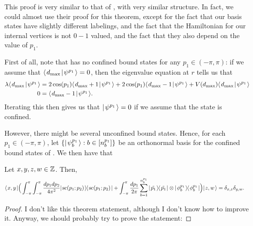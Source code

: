 \documentclass[../thesis-main/thesis-main]{subfiles}
\begin{document}
This proof is very similar to that of \cite{CG12}, with very similar structure.  In fact, we could almost use their proof for this theorem, except for the fact that our basis states have slightly different labelings, and the fact that the Hamiltonian for our internal vertices is not $0-1$ valued, and the fact that they also depend on the value of $p_1$.  

First of all, note that  has no confined bound states for any $p_1\in (-\pi,\pi)$: if we assume that $\langle\mspace{2mu} d_{\text{max}} \mspace{2mu} | \mspace{2mu} \psi^{p_1}\mspace{2mu} \rangle = 0$, then the eigenvalue equation at $r$ tells us that
\begin{align}
  \lambda \langle\mspace{2mu} d_{\text{max}} \mspace{2mu} | \mspace{2mu} \psi^{p_1}\mspace{2mu} \rangle &= 2\cos(p_1) \langle\mspace{2mu} d_{\text{max}}+1 \mspace{2mu} | \mspace{2mu} \psi^{p_1}\mspace{2mu} \rangle + 2\cos(p_1)\langle\mspace{2mu} d_{\text{max}}-1 \mspace{2mu} | \mspace{2mu} \psi^{p_1}\mspace{2mu} \rangle + V(d_{\text{max}}) \langle\mspace{2mu} d_{\text{max}} \mspace{2mu} | \mspace{2mu} \psi^{p_1}\mspace{2mu} \rangle\\
  0 &= \langle\mspace{2mu} d_{\text{max}} -1 \mspace{2mu} | \mspace{2mu} \psi^{p_1}\mspace{2mu} \rangle.
\end{align}
Iterating this then gives us that $|\mspace{2mu} \psi^{p_1} \mspace{2mu} \rangle = 0$ if we assume that the state is confined.

However, there might be several unconfined bound states.  Hence, for each $p_1\in (-\pi,\pi)$, let $\{|\mspace{2mu} \psi_b^{p_1} \mspace{2mu} \rangle : b\in [n_b^{p_1}]\}$ be an orthonormal basis for the confined bound states of .  We then have that

\begin{theorem}
  Let $x,y,z,w \in \mathbb{Z}$.  Then,
  \begin{align}
    \langle\mspace{2mu} x,y \mspace{2mu} | \Big( \int_{-\pi}^\pi \int_{-\pi}^{\pi} \frac{d p_1 d p_2}{4\pi^2} |\mspace{2mu} \text{sc}(p_1;p_2) \mspace{2mu} \rangle\mspace{-2mu}\langle\mspace{2mu} \text{sc}(p_1;p_2) \mspace{2mu} | + \int_{-\pi}^\pi \frac{d p_1}{2\pi} \sum_{b=1}^{n_b^{p_1}} |\mspace{2mu} \tilde{p_1} \mspace{2mu} \rangle\mspace{-2mu}\langle\mspace{2mu} \tilde{p_1} \mspace{2mu} | \otimes |\mspace{2mu} \phi_{b}^{p_1} \mspace{2mu} \rangle\mspace{-2mu}\langle\mspace{2mu} \phi_b^{p_1} \mspace{2mu} | \Big) |\mspace{2mu} z,w \mspace{2mu} \rangle &= \delta_{x,z} \delta_{y,w}.
  \end{align}
\end{theorem}

\begin{proof}
  I don't like this theorem statement, although I don't know how to improve it.  Anyway, we should probably try to prove the statement:
  
\end{proof}

\biblio{}
\end{document}
